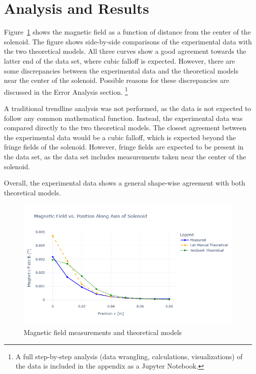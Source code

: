 \documentclass[11pt]{article}
\begin{document}
\section{Analysis and Results}
Figure~\ref{fig:b_z-vs-z} shows the magnetic field as a function of distance from the center of the solenoid.
The figure shows side-by-side comparisons of the experimental data with the two theoretical models.
All three curves show a good agreement towards the latter end of the data set, where cubic falloff is expected.
However, there are some discrepancies between the experimental data and the theoretical models near the center of the solenoid.
Possible reasons for these discrepancies are discussed in the Error Analysis section.
\footnote{A full step-by-step analysis (data wrangling, calculations, visualizations) of the data is included in the appendix as a Jupyter Notebook.}

A traditional trendline analysis was not performed, as the data is not expected to follow any common mathematical function.
Instead, the experimental data was compared directly to the two theoretical models.
The closest agreement between the experimental data would be a cubic falloff, which is expected beyond the fringe fields of the solenoid.
However, fringe fields are expected to be present in the data set, as the data set includes measurements taken near the center of the solenoid.

Overall, the experimental data shows a general shape-wise agreement with both theoretical models.

\begin{figure}[H]
    \centering
    \includegraphics[width=0.8\linewidth]{../notebooks/figures/fig1.png}
    \caption{Magnetic field measurements and theoretical models}
    \label{fig:b_z-vs-z}
\end{figure}
\end{document}
